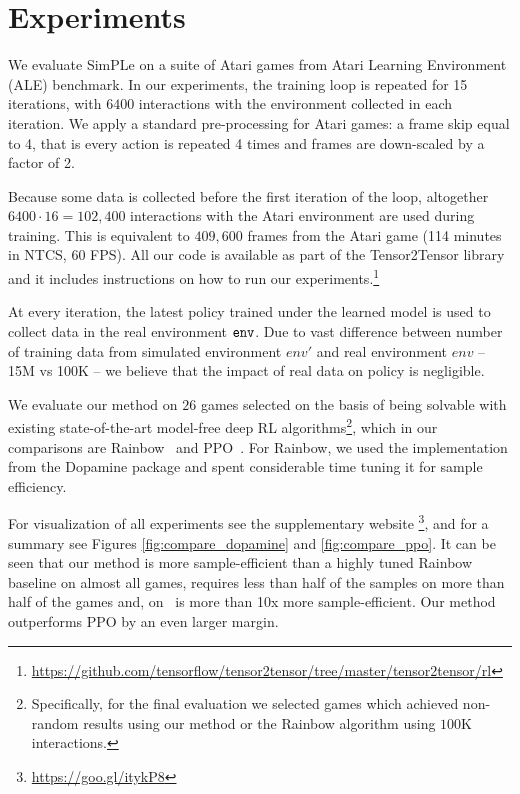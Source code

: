 \section{Experiments}
\label{sec:experiments}

We evaluate SimPLe on a suite of Atari games from Atari Learning Environment (ALE) benchmark.
In our experiments, the training loop is repeated for 15 iterations, with $6400$ interactions with the environment collected in each iteration.
We apply a standard pre-processing for Atari games: a frame skip equal to 4, that is every action
is repeated 4 times and frames are down-scaled by a factor of 2.

Because some data is collected before the first iteration of the loop,
altogether $6400 \cdot 16 = 102,400$ interactions with the Atari environment are used during training.
This is equivalent to $409,600$ frames from the Atari game (114 minutes in NTCS, 60 FPS).
All our code is available as part of the Tensor2Tensor library and it includes instructions on how
to run our experiments.\footnote{\url{https://github.com/tensorflow/tensor2tensor/tree/master/tensor2tensor/rl}} 

At every iteration, the latest policy trained under the learned model is used to collect data in the real environment ${\texttt{env}}$.
Due to vast difference between number of training data from simulated environment $env'$ and real environment $env$ -- 15M vs 100K
-- we believe that the impact of real data on policy is negligible.

 We evaluate our method on $26$ games selected on the basis of being solvable with existing state-of-the-art model-free deep RL algorithms\footnote{Specifically, for the final evaluation we selected games which achieved non-random results using our method or the Rainbow algorithm using $100$K interactions.}, which in our comparisons are Rainbow~\cite{rainbow} and PPO~\cite{ppo}.
 For Rainbow, we used the implementation from the Dopamine package and spent considerable
 time tuning it for sample efficiency.

For visualization of all experiments see the supplementary website \footnote{\url{https://goo.gl/itykP8}},
and for a summary see Figures \ref{fig:compare_dopamine} and  \ref{fig:compare_ppo}.
It can be seen that our method is more sample-efficient than a highly tuned Rainbow baseline on almost all games, requires less than half of the samples on more than half of the games and, on \freeway\, is more than 10x more sample-efficient. Our method outperforms PPO by an even larger margin.